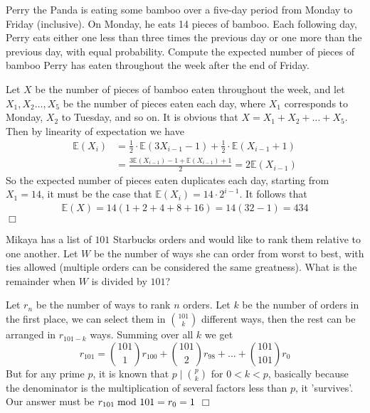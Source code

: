 \begin{problem}
    Perry the Panda is eating some bamboo over a five-day period from Monday to Friday (inclusive). On Monday, he eats 14 pieces of bamboo. Each following day, Perry eats either one less than three times the previous day or one more than the previous day, with equal probability. Compute the expected number of pieces of bamboo Perry has eaten throughout the week after the end of Friday.
\end{problem}

\begin{solution}[434]
    Let $X$ be the number of pieces of bamboo eaten throughout the week, and let $X_1, X_2 \ldots, X_5$ be the number of pieces eaten each day, where $X_1$ corresponds to Monday, $X_2$ to Tuesday, and so on. It is obvious that $X = X_1 + X_2 + \ldots + X_5$. Then by linearity of expectation we have
    \begin{align*}
        \mathbb{E}(X_i) &= \frac{1}{2} \cdot \mathbb{E} (3X_{i-1} - 1) + \frac{1}{2} \cdot \mathbb{E}( X_{i-1}+1) \\
        &= \frac{3\mathbb{E}(X_{i-1}) - 1 + \mathbb{E}(X_{i-1}) + 1}{2} = 2 \mathbb{E} (X_{i-1})
    \end{align*}
    So the expected number of pieces eaten duplicates each day, starting from $X_1 = 14$, it must be the case that $\mathbb{E}(X_i) = 14 \cdot 2^{i-1}$. It follows that 
    \begin{align*}
        \mathbb{E}(X) = 14 (1 + 2 + 4 + 8 + 16) = 14(32-1) = 434
    \end{align*}
    $\Box$
\end{solution}

\begin{problem}
    Mikaya has a list of $101$ Starbucks orders and would like to rank them relative to one another. Let $W$ be the number of ways she can order from worst to best, with ties allowed (multiple orders can be considered the same greatness). What is the remainder when $W$ is divided by $101$?
\end{problem}

\begin{solution}[1]
    Let $r_n$ be the number of ways to rank $n$ orders. Let $k$ be the number of orders in the first place, we can select them in $\binom{101}{k}$ different ways, then the rest can be arranged in $r_{101-k}$ ways. Summing over all $k$ we get 
    $$ r_{101} = \binom{101}{1}r_{100} + \binom{101}{2}r_{98} + \ldots + \binom{101}{101}r_0 $$
    But for any prime $p$, it is known that $p \mid \binom{p}{k}$ for $0 < k <p$, basically because the denominator is the multiplication of several factors less than $p$, it 'survives'. Our answer must be $r_{101} \hspace{-4pt} \mod{101} = r_0 = 1$ $\Box$
\end{solution}

